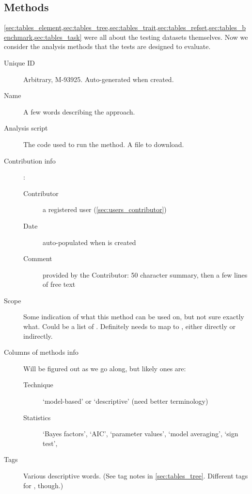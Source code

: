 \subsection{Methods}
\label{sec:tables_method}

\cref{sec:tables_element,sec:tables_tree,sec:tables_trait,sec:tables_refset,sec:tables_benchmark,sec:tables_task} were all about the testing datasets themselves.
Now we consider the analysis methods that the tests are designed to evaluate.

\begin{description}
    \item[Unique ID] Arbitrary, \eg M-93925.  Auto-generated when created.
    \item[Name] A few words describing the approach. %
    \item[Analysis script] The code used to run the method.  A file to download.
    \item[Contribution info]:
        \begin{description}
            \item[Contributor] a registered user (\cref{sec:users_contributor})
            \item[Date] auto-populated when \Method is created
            \item[Comment] provided by the Contributor: 50 character summary, then a few lines of free text
        \end{description}
    \item[Scope] Some indication of what this method can be used on, but not sure exactly what.
            Could be a list of \Refsets.  Definitely needs to map to \Tasks, either directly or indirectly.
    \item[Columns of methods info] Will be figured out as we go along, but likely ones are:
        \begin{description}
            \item [Technique] `model-based' or `descriptive' (need better terminology)
            \item [Statistics] `Bayes factors', `AIC', `parameter values', `model averaging', `sign test', \etc
        \end{description}
    \item [Tags] Various descriptive words. %
            (See tag notes in \cref{sec:tables_tree}.  Different tags for \Methods, though.)
\end{description}

